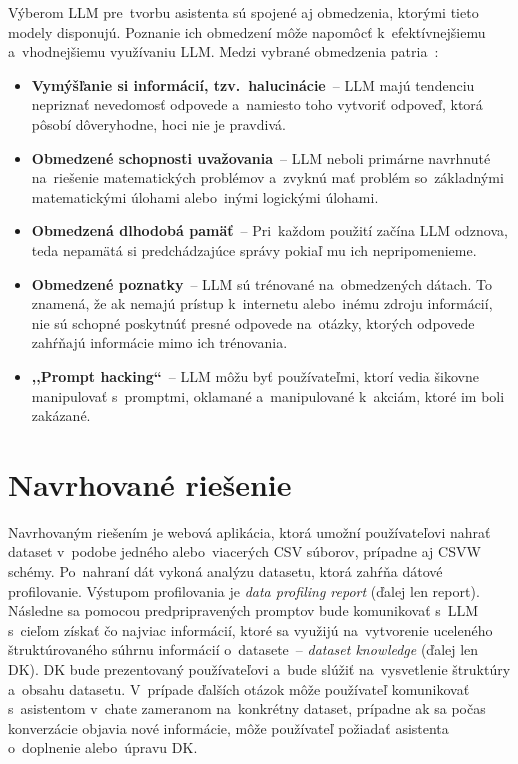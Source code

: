 Výberom LLM pre~tvorbu asistenta sú spojené aj obmedzenia, ktorými tieto modely disponujú. Poznanie ich obmedzení môže napomôcť k~efektívnejšiemu a~vhodnejšiemu využívaniu LLM. Medzi vybrané obmedzenia patria~\cite{llm-limitations}:
\begin{itemize}
\item \textbf{Vymýšľanie si informácií, tzv.~halucinácie}~-- LLM majú tendenciu nepriznať nevedomosť odpovede a~namiesto toho vytvoriť odpoveď, ktorá pôsobí dôveryhodne, hoci nie je pravdivá. %

\item \textbf{Obmedzené schopnosti uvažovania}~-- LLM neboli primárne navrhnuté na~riešenie matematických problémov a~zvyknú mať problém so~základnými matematickými úlohami alebo~inými logickými úlohami. %

\item \textbf{Obmedzená dlhodobá pamäť}~-- Pri~každom použití začína LLM odznova, teda nepamätá si predchádzajúce správy pokiaľ mu ich nepripomenieme. %

\item \textbf{Obmedzené poznatky}~-- LLM sú trénované na~obmedzených dátach. To znamená, že ak nemajú prístup k~internetu alebo~inému zdroju informácií, nie sú schopné poskytnúť presné odpovede na~otázky, ktorých odpovede zahŕňajú informácie mimo ich trénovania. %

\item \textbf{,,Prompt hacking``}~-- LLM môžu byť používateľmi, ktorí vedia šikovne manipulovať s~promptmi, oklamané a~manipulované k~akciám, ktoré im boli zakázané. %
\end{itemize}

\section{Navrhované riešenie}

Navrhovaným riešením je webová aplikácia, ktorá umožní používateľovi nahrať dataset v~podobe jedného alebo~viacerých CSV súborov, prípadne aj CSVW schémy. Po~nahraní dát vykoná analýzu datasetu, ktorá zahŕňa dátové profilovanie. Výstupom profilovania je \textit{data profiling report} (ďalej len report). Následne sa pomocou predpripravených promptov bude komunikovať s~LLM s~cieľom získať čo najviac informácií, ktoré sa využijú na~vytvorenie uceleného štruktúrovaného súhrnu informácií o~datasete~-- \textit{dataset knowledge} (ďalej len DK). DK bude prezentovaný používateľovi a~bude slúžiť na~vysvetlenie štruktúry a~obsahu datasetu. V~prípade ďalších otázok môže používateľ komunikovať s~asistentom v~chate zameranom na~konkrétny dataset, prípadne ak sa počas konverzácie objavia nové informácie, môže používateľ požiadať asistenta o~doplnenie alebo~úpravu DK.

